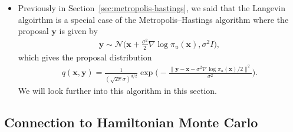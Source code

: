 \documentclass[10pt]{article}
\newcommand{\ve}[1]{\mathbf{#1}}
\newcommand{\mcal}[1]{\mathcal{#1}}
\begin{document}
\begin{itemize}
  \item Previously in Section~\ref{sec:metropolis-hastings}, we said that the Langevin algoirthm is a special case of the Metropolis--Hastings algorithm where the proposal $\ve{y}$ is given by
  \begin{align*}
    \ve{y} \sim \mcal{N}\bigg( \ve{x} + \frac{\sigma^2}{2} \nabla \log \pi_u(\ve{x}), \sigma^2 I \bigg),
  \end{align*}
  which gives the proposal distribution
  \begin{align*}
    q(\ve{x},\ve{y}) = \frac{1}{ (\sqrt{2\pi} \sigma)^{d/2} } \exp\bigg( - \frac{ \| \ve{y} - \ve{x} - \sigma^2 \nabla \log \pi_u(\ve{x})/2 \|^2}{\sigma^2} \bigg).
  \end{align*}
  We will look further into this algorithm in this section.
\end{itemize}

\subsection{Connection to Hamiltonian Monte Carlo}
\end{document}

